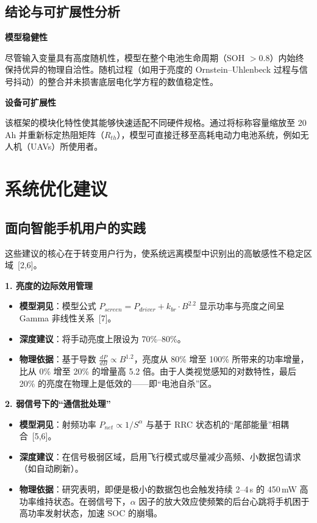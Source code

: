 \documentclass[11pt,a4paper]{ctexart}
\begin{document}
\subsection{结论与可扩展性分析}

\textbf{模型稳健性}

尽管输入变量具有高度随机性，模型在整个电池生命周期（SOH $>0.8$）内始终保持优异的物理自洽性。随机过程（如用于亮度的 Ornstein--Uhlenbeck 过程与信号抖动）的整合并未损害底层电化学方程的数值稳定性。

\textbf{设备可扩展性}

该框架的模块化特性使其能够快速适配不同硬件规格。通过将标称容量缩放至 20\,Ah 并重新标定热阻矩阵（$R_{th}$），模型可直接迁移至高耗电动力电池系统，例如无人机（UAVs）所使用者。
\section{系统优化建议}

\subsection{面向智能手机用户的实践}

这些建议的核心在于转变用户行为，使系统远离模型中识别出的高敏感性不稳定区域~[2,6]。

\textbf{1. 亮度的边际效用管理}

\begin{itemize}
\item \textbf{模型洞见}：模型公式 $P_{screen}=P_{driver}+k_{br}\cdot B^{2.2}$ 显示功率与亮度之间呈 Gamma 非线性关系~[7]。
\item \textbf{深度建议}：将手动亮度上限设为 70\%--80\%。
\item \textbf{物理依据}：基于导数 $\frac{dP}{dB}\propto B^{1.2}$，亮度从 80\% 增至 100\% 所带来的功率增量，比从 0\% 增至 20\% 的增量高 5.2 倍。由于人类视觉感知的对数特性，最后 20\% 的亮度在物理上是低效的——即“电池自杀”区。
\end{itemize}

\textbf{2. 弱信号下的“通信批处理”}

\begin{itemize}
\item \textbf{模型洞见}：射频功率 $P_{net}\propto 1/S^{\alpha}$ 与基于 RRC 状态机的“尾部能量”相耦合~[5,6]。
\item \textbf{深度建议}：在信号极弱区域，启用飞行模式或尽量减少高频、小数据包请求（如自动刷新）。
\item \textbf{物理依据}：研究表明，即便是极小的数据包也会触发持续 2--4\,s 的 450\,mW 高功率维持状态。在弱信号下，$\alpha$ 因子的放大效应使频繁的后台心跳将手机困于高功率发射状态，加速 SOC 的崩塌。
\end{itemize}
\end{document}
